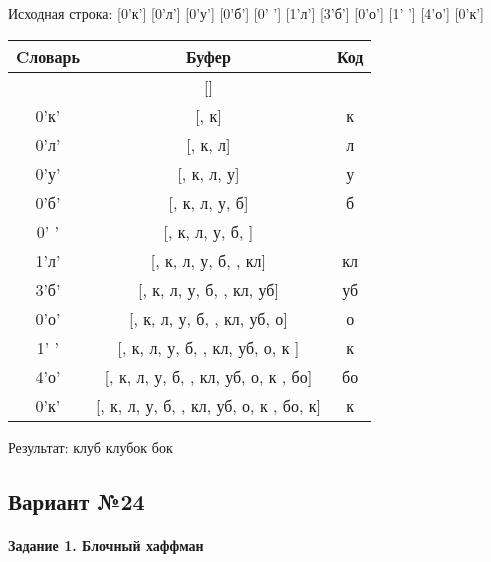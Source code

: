 \documentclass[a4paper, 12pt]{article}
\begin{document}
Исходная строка: [0'к'] [0'л'] [0'у'] [0'б'] [0' '] [1'л'] [3'б'] [0'о'] [1' '] [4'о'] [0'к']\\
\begin{table}[h!]
\centering
\begin{tabular}{|c|c|c|}
\hline
 Cловарь & Буфер & Код  \\ \hline
 & [] & 
\\ \hline
0'к' & [, к] & к
\\ \hline
0'л' & [, к, л] & л
\\ \hline
0'у' & [, к, л, у] & у
\\ \hline
0'б' & [, к, л, у, б] & б
\\ \hline
0' ' & [, к, л, у, б,  ] &  
\\ \hline
1'л' & [, к, л, у, б,  , кл] & кл
\\ \hline
3'б' & [, к, л, у, б,  , кл, уб] & уб
\\ \hline
0'о' & [, к, л, у, б,  , кл, уб, о] & о
\\ \hline
1' ' & [, к, л, у, б,  , кл, уб, о, к ] & к 
\\ \hline
4'о' & [, к, л, у, б,  , кл, уб, о, к , бо] & бо
\\ \hline
0'к' & [, к, л, у, б,  , кл, уб, о, к , бо, к] & к
\\ \hline
\end{tabular}
\end{table}

Результат: клуб клубок бок
\pagebreak
\subsection{Вариант №24}
\paragraph{Задание 1. Блочный хаффман \\}
\end{document}
